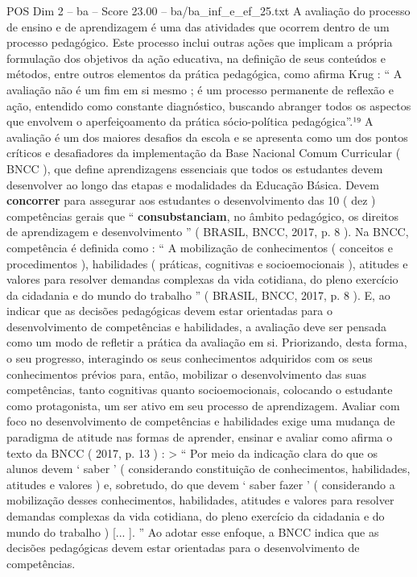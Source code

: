 \begin{textsample}{POS Dim 2 – ba – Score 23.00 – ba/ba\_inf\_e\_ef\_25.txt}
A avaliação do processo de ensino e de aprendizagem é uma das atividades que ocorrem dentro de um processo pedagógico.
Este processo inclui outras ações que implicam a própria formulação dos objetivos da ação educativa, na definição de seus conteúdos e métodos, entre outros elementos da prática pedagógica, como afirma Krug : “ A avaliação não é um fim em si mesmo ; é um processo permanente de reflexão e ação, entendido como constante diagnóstico, buscando abranger todos os aspectos que envolvem o aperfeiçoamento da prática sócio-política pedagógica”.¹⁹ A avaliação é um dos maiores desafios da escola e se apresenta como um dos pontos críticos e desafiadores da implementação da Base Nacional Comum Curricular ( BNCC ), que define aprendizagens essenciais que todos os estudantes devem desenvolver ao longo das etapas e modalidades da Educação Básica.
Devem \textbf{concorrer} para assegurar aos estudantes o desenvolvimento das 10 ( dez ) competências gerais que “ \textbf{consubstanciam}, no âmbito pedagógico, os direitos de aprendizagem e desenvolvimento ” ( BRASIL, BNCC, 2017, p. 8 ).
Na BNCC, competência é definida como : “ A mobilização de conhecimentos ( conceitos e procedimentos ), habilidades ( práticas, cognitivas e socioemocionais ), atitudes e valores para resolver demandas complexas da vida cotidiana, do pleno exercício da cidadania e do mundo do trabalho ” ( BRASIL, BNCC, 2017, p. 8 ).
E, ao indicar que as decisões pedagógicas devem estar orientadas para o desenvolvimento de competências e habilidades, a avaliação deve ser pensada como um modo de refletir a prática da avaliação em si.
Priorizando, desta forma, o seu progresso, interagindo os seus conhecimentos adquiridos com os seus conhecimentos prévios para, então, mobilizar o desenvolvimento das suas competências, tanto cognitivas quanto socioemocionais, colocando o estudante como protagonista, um ser ativo em seu processo de aprendizagem.
Avaliar com foco no desenvolvimento de competências e habilidades exige uma mudança de paradigma de atitude nas formas de aprender, ensinar e avaliar como afirma o texto da BNCC ( 2017, p. 13 ) : > “ Por meio da indicação clara do que os alunos devem ‘ saber ’ ( considerando constituição de conhecimentos, habilidades, atitudes e valores ) e, sobretudo, do que devem ‘ saber fazer ’ ( considerando a mobilização desses conhecimentos, habilidades, atitudes e valores para resolver demandas complexas da vida cotidiana, do pleno exercício da cidadania e do mundo do trabalho ) [... ]. ” Ao adotar esse enfoque, a BNCC indica que as decisões pedagógicas devem estar orientadas para o desenvolvimento de competências.

\end{textsample}
